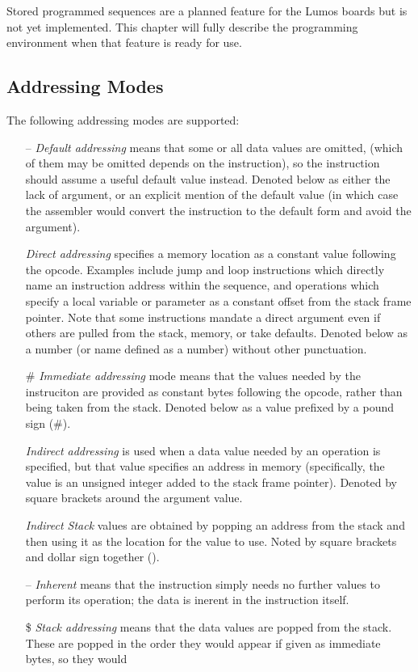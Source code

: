\documentclass[letterpaper,twoside,onecolumn,openright,final]{memoir}
\begin{document}
\begin{NotImplemented*}{Stored programmed sequences are a planned feature for the Lumos boards but is not
yet implemented.  This chapter will fully describe the programming environment when that feature is
ready for use.}
\subsection{Addressing Modes}
The following addressing modes are supported:
\begin{itemize}
	\item[--] \emph{Default addressing} means that some or all data values are omitted, 
		(which of them may be omitted depends on the instruction), so
		the instruction should assume
		a useful default value instead.  Denoted below as either the lack of argument, or
		an explicit mention of the default value (in which case the assembler would convert
		the instruction to the default form and avoid the argument).
	\item[\Var{a}] \emph{Direct addressing} specifies a memory location as a constant value following
		the opcode.  Examples include jump and loop instructions which directly name an
		instruction address within the sequence, and operations which specify a local
		variable or parameter as a constant offset from the stack frame pointer.  Note
		that some instructions mandate a direct argument even if others are pulled from
		the stack, memory, or take defaults.  Denoted below as a number (or name
		defined as a number) without other punctuation.
	\item[\z\#\Var{v}] \emph{Immediate addressing} mode means that the values needed by the instruciton are
		provided as constant bytes following the opcode, rather than being taken from the
		stack.  Denoted below as a value prefixed by a pound sign (\z\#).
	\item[{\z[\Var{a}\z]}] \emph{Indirect addressing} is used when a data value needed by an operation is
		specified, but that value specifies an address in memory (specifically, the value
		is an unsigned integer added to the stack frame pointer).  
		Denoted by square brackets around the argument value.
	\item[{\z{[\$]}}] \emph{Indirect Stack} values are obtained by popping an address from the stack and
		then using it as the location for the value to use.  Noted by square brackets
		and dollar sign together (\z{[\$]}).
	\item[--] \emph{Inherent} means that the instruction simply needs no further values to perform
		its operation; the data is inerent in the instruction itself.
	\item[\z\$] \emph{Stack addressing} means that the data values are popped from the stack.  These are
		popped in the order they would appear if given as immediate bytes, so they would

\end{itemize}
\end{NotImplemented*}
\end{document}
